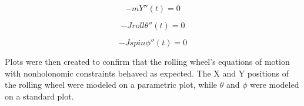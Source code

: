 \begin{equation}
\label{eq:Yroll}
-mY''(t)=0
\end{equation}

\begin{equation}
\label{eq:thetaroll}
-Jroll\theta''(t)=0
\end{equation}

\begin{equation}
\label{eq:phiroll}
-Jspin\phi''(t)=0
\end{equation}

Plots were then created to confirm that the rolling wheel's equations of motion with nonholonomic constraints behaved as expected.
The X and Y positions of the rolling wheel were modeled on a parametric plot, while $\theta$ and $\phi$ were modeled on a standard plot.

